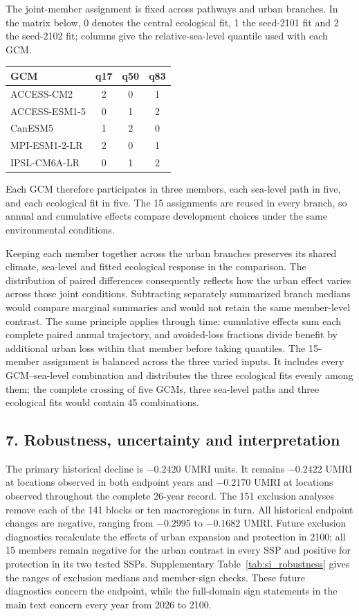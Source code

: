 The joint-member assignment is fixed across pathways and urban branches. In the matrix below, 0 denotes the central ecological fit, 1 the seed-2101 fit and 2 the seed-2102 fit; columns give the relative-sea-level quantile used with each GCM.
\begin{center}\small
\begin{tabular}{lccc}
\toprule
GCM & q17 & q50 & q83\\
\midrule
ACCESS-CM2 & 2 & 0 & 1\\
ACCESS-ESM1-5 & 0 & 1 & 2\\
CanESM5 & 1 & 2 & 0\\
MPI-ESM1-2-LR & 2 & 0 & 1\\
IPSL-CM6A-LR & 0 & 1 & 2\\
\bottomrule
\end{tabular}
\end{center}
Each GCM therefore participates in three members, each sea-level path in five, and each ecological fit in five. The 15 assignments are reused in every branch, so annual and cumulative effects compare development choices under the same environmental conditions.

Keeping each member together across the urban branches preserves its shared climate, sea-level and fitted ecological response in the comparison. The distribution of paired differences consequently reflects how the urban effect varies across those joint conditions. Subtracting separately summarized branch medians would compare marginal summaries and would not retain the same member-level contrast. The same principle applies through time: cumulative effects sum each complete paired annual trajectory, and avoided-loss fractions divide benefit by additional urban loss within that member before taking quantiles. The 15-member assignment is balanced across the three varied inputs. It includes every GCM--sea-level combination and distributes the three ecological fits evenly among them; the complete crossing of five GCMs, three sea-level paths and three ecological fits would contain 45 combinations.


\subsection{7. Robustness, uncertainty and interpretation}

The primary historical decline is $-0.2420$ UMRI units. It remains $-0.2422$ UMRI at locations observed in both endpoint years and $-0.2170$ UMRI at locations observed throughout the complete 26-year record. The 151 exclusion analyses remove each of the 141 blocks or ten macroregions in turn. All historical endpoint changes are negative, ranging from $-0.2995$ to $-0.1682$ UMRI. Future exclusion diagnostics recalculate the effects of urban expansion and protection in 2100; all 15 members remain negative for the urban contrast in every SSP and positive for protection in its two tested SSPs. Supplementary Table~\ref{tab:si_robustness} gives the ranges of exclusion medians and member-sign checks. These future diagnostics concern the endpoint, while the full-domain sign statements in the main text concern every year from 2026 to 2100.


